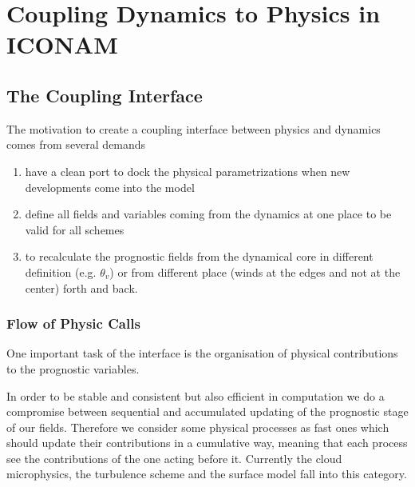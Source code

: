 %

\chapter{Coupling Dynamics to Physics in ICONAM}

\section{The Coupling Interface}
The motivation to create a coupling interface between physics and dynamics comes from several demands
\begin{enumerate}
\item have a clean port to dock the physical parametrizations when new developments come into the model

\item define all fields and variables coming from the dynamics at one place to be valid for all schemes

\item to recalculate the prognostic fields from the dynamical core in different definition (e.g. $\theta_v$) or from different place (winds at the edges and not at the center) forth and back.

\end{enumerate}

\subsection{Flow of Physic Calls}

One important task of the interface is the organisation of physical contributions to the prognostic variables.

In order to be stable and consistent but also efficient in computation we do a compromise between sequential and accumulated updating of the prognostic stage of our fields. Therefore we consider some physical processes as fast ones which should update their contributions in a cumulative way, meaning that each process see the contributions of the one acting before it. Currently the cloud microphysics, the turbulence scheme and the surface model fall into this category.\\

